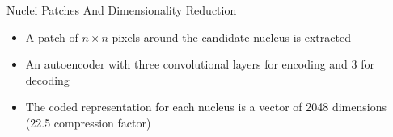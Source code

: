 \documentclass[usenames,dvipsnames]{beamer}
\begin{document}
%

\begin{frame}{Nuclei Patches And Dimensionality Reduction}
\begin{itemize}
\item<1-> A patch of $n \times n $ pixels around the candidate nucleus is extracted

\item<2-> An autoencoder with three convolutional layers for encoding and 3 for decoding 

\item<3-> The coded representation for each nucleus is a vector of 2048 dimensions (22.5 compression factor)
\end{itemize}

\end{frame}
\end{document}
